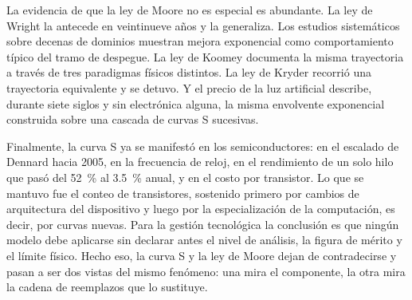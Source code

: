 \documentclass[11pt,letterpaper]{article}
\begin{document}
La evidencia de que la ley de Moore no es especial es abundante. La ley de Wright
la antecede en veintinueve años y la generaliza. Los estudios sistemáticos sobre
decenas de dominios muestran mejora exponencial como comportamiento típico del
tramo de despegue. La ley de Koomey documenta la misma trayectoria a través de
tres paradigmas físicos distintos. La ley de Kryder recorrió una trayectoria
equivalente y se detuvo. Y el precio de la luz artificial describe, durante siete
siglos y sin electrónica alguna, la misma envolvente exponencial construida sobre
una cascada de curvas S sucesivas.

Finalmente, la curva S ya se manifestó en los semiconductores: en el escalado de
Dennard hacia 2005, en la frecuencia de reloj, en el rendimiento de un solo hilo
que pasó del \SI{52}{\percent} al \SI{3.5}{\percent} anual, y en el costo por
transistor. Lo que se mantuvo fue el conteo de transistores, sostenido primero
por cambios de arquitectura del dispositivo y luego por la especialización de la
computación, es decir, por curvas nuevas. Para la gestión tecnológica la
conclusión es que ningún modelo debe aplicarse sin declarar antes el nivel de
análisis, la figura de mérito y el límite físico. Hecho eso, la curva S y la ley
de Moore dejan de contradecirse y pasan a ser dos vistas del mismo fenómeno: una
mira el componente, la otra mira la cadena de reemplazos que lo sustituye.

\printbibliography[title={Referencias bibliográficas}]
\end{document}
